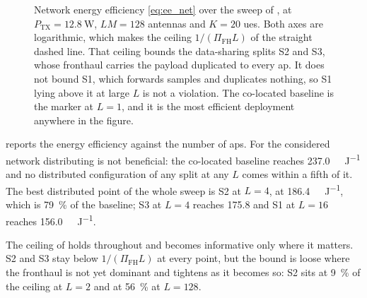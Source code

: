 \begin{figure}[t]
\centering

\caption{Network energy efficiency \eqref{eq:ee_net} over the sweep of
, at $P_{\mathrm{TX}}=\SI{12.8}{\watt}$, $LM=128$ antennas and
$K=20$ \glspl{ue}. Both axes are logarithmic, which makes the ceiling
$1/(\Pi_{\mathrm{FH}}L)$ of  the straight dashed line. That
ceiling bounds the data-sharing splits S2 and S3, whose fronthaul carries the
payload duplicated to every \gls{ap}. It does not bound S1, which forwards
samples and duplicates nothing, so S1 lying above it at large $L$ is not a
violation. The co-located baseline is the marker at $L=1$, and it is the
most efficient deployment anywhere in the figure.}
\label{fig:eval4}
\end{figure}

 reports the energy efficiency against the number of \glspl{ap}. For the considered network distributing is not beneficial: the
co-located baseline reaches \SI{237.0}{\mega\bit\per\joule} and no distributed
configuration of any split at any $L$ comes within a fifth of it. The best
distributed point of the whole sweep is S2 at $L=4$, at
\SI{186.4}{\mega\bit\per\joule}, which is \SI{79}{\percent} of the baseline; S3
at $L=4$ reaches \SI{175.8}{} and S1 at $L=16$ reaches
\SI{156.0}{\mega\bit\per\joule}. 

The ceiling of  holds throughout and becomes informative
only where it matters. S2 and S3 stay below $1/(\Pi_{\mathrm{FH}}L)$ at every
point, but the bound is loose where the fronthaul is not yet dominant and
tightens as it becomes so: S2 sits at \SI{9}{\percent} of the ceiling at $L=2$
and at \SI{56}{\percent} at $L=128$. 

